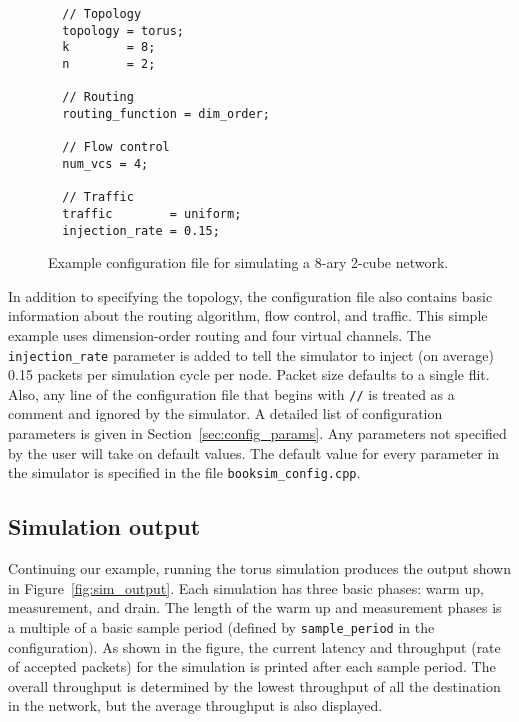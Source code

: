 \documentclass[11pt]{article}
\begin{document}
\begin{figure}
\begin{verbatim}
  // Topology
  topology = torus;
  k        = 8;
  n        = 2;

  // Routing
  routing_function = dim_order;

  // Flow control
  num_vcs = 4;

  // Traffic
  traffic        = uniform;
  injection_rate = 0.15;
\end{verbatim}
\caption{Example configuration file for simulating a 8-ary 2-cube
network.}
\label{fig:config_example}
\end{figure}

In addition to specifying the topology, the configuration file also contains basic information about the routing algorithm, flow control, and traffic.
This simple example uses dimension-order routing and four virtual channels.
The \texttt{injection\_rate} parameter is added to tell the simulator to inject (on average) 0.15 packets per simulation cycle per node.
Packet size defaults to a single flit.
Also, any line of the configuration file that begins with \texttt{//} is treated as a comment and ignored by the simulator.
A detailed list of configuration parameters is given in Section~\ref{sec:config_params}.
Any parameters not specified by the user will take on default values.
The default value for every parameter in the simulator is specified in the file \texttt{booksim\_config.cpp}.

\subsection{Simulation output}

Continuing our example, running the torus simulation produces the
output shown in Figure~\ref{fig:sim_output}.  Each simulation has
three basic phases: warm up, measurement, and drain.  The length of
the warm up and measurement phases is a multiple of a basic sample
period (defined by \texttt{sample\_period} in the configuration).  As
shown in the figure, the current latency and throughput (rate of
accepted packets) for the simulation is printed after each sample
period.  The overall throughput is determined by the lowest throughput
of all the destination in the network, but the average throughput is
also displayed.
\end{document}
